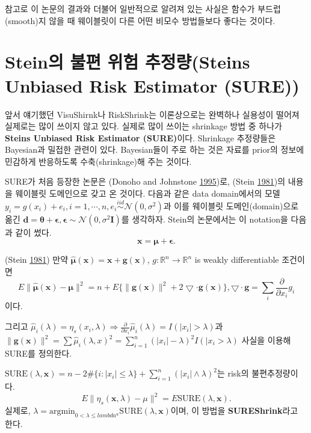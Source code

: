 \documentclass[b5paper,]{book}
\theoremstyle{definition}
\theoremstyle{definition}
\theoremstyle{definition}
\theoremstyle{remark}
\let\BeginKnitrBlock\begin \let\EndKnitrBlock\end
\begin{document}
참고로 이 논문의 결과와 더불어 일반적으로 알려져 있는 사실은 함수가
부드럽(smooth)지 않을 때 웨이블릿이 다른 어떤 비모수 방법들보다 좋다는
것이다.

\section{Stein의 불편 위험 추정량(Steins Unbiased Risk Estimator
(SURE))}\label{stein---steins-unbiased-risk-estimator-sure}

앞서 얘기했던 VisuShirnk나 RiskShrink는 이론상으로는 완벽하나 실용성이
떨어져 실제로는 많이 쓰이지 않고 있다. 실제로 많이 쓰이는 shrinkage 방법
중 하나가 \textbf{Steins Unbiased Risk Estimator (SURE)}이다. Shrinkage
추정량들은 Bayesian과 밀접한 관련이 있다. Bayesian들이 주로 하는 것은
자료를 prior의 정보에 민감하게 반응하도록 수축(shrinkage)해 주는 것이다.

SURE가 처음 등장한 논문은 (Donoho and Johnstone
\protect\hyperlink{ref-Donoho1995}{1995})로, (Stein
\protect\hyperlink{ref-Stein1981}{1981})의 내용을 웨이블릿 도메인으로
갖고 온 것이다. 다음과 같은 data domain에서의 모델
\(y_{i}=g(x_{i})+e_{i}, i=1,\cdots,n,e_{i} \stackrel{iid}{\sim} \mathcal{N}(0,\sigma^{2})\)과
이를 웨이블릿 도메인(domain)으로 옮긴
\(\mathbf{d}=\boldsymbol{\theta}+\boldsymbol{\epsilon}, \boldsymbol{\epsilon} \sim \mathcal{N}(0,\sigma^{2}\mathbf{I})\)를
생각하자. Stein의 논문에서는 이 notation을 다음과 같이 썼다.
\[\mathbf{x}=\boldsymbol{\mu}+\boldsymbol{\epsilon}.\]

\BeginKnitrBlock{theorem}[Stein]
\protect\hypertarget{thm:unnamed-chunk-129}{}{\label{thm:unnamed-chunk-129}
{} }(Stein \protect\hyperlink{ref-Stein1981}{1981})
만약 \(\hat{\boldsymbol{\mu}}\mathbf{(x)}=\mathbf{x}+\mathbf{g(x)}\),
\(g:\mathbb{R}^{n} \rightarrow \mathbb{R}^{n}\) is weakly differentiable
조건이면
\[E \| \hat{\boldsymbol{\mu}}\mathbf{(x)}-\boldsymbol{\mu} \|^{2} =n+ E\{ \|\mathbf{g(x)}\|^{2}+2\bigtriangledown \cdot \mathbf{g(x)} \}, \bigtriangledown\cdot \mathbf{g}=\sum_{i} \frac{\partial}{\partial x_{i}}g_{i}\]
이다.
\EndKnitrBlock{theorem}

그리고
\(\hat{\mu}_{i}(\lambda)=\eta_{s}(x_{i},\lambda) \Rightarrow \frac{\partial}{\partial x_{i}}\hat{\mu}_{i}(\lambda)=I( |x_{i}|>\lambda)\)과
\(\| \mathbf{g(x)} \|^{2}=\sum \hat{\mu}_{i}(\lambda, x)^{2}=\sum_{i=1}^{n}(|x_{i}|-\lambda)^{2}I(|x_{i}>\lambda)\)
사실을 이용해 SURE를 정의한다.

\BeginKnitrBlock{theorem}[SURE]
\protect\hypertarget{thm:unnamed-chunk-130}{}{\label{thm:unnamed-chunk-130}
{}
}\(\text{SURE}(\lambda,\mathbf{x})=n-2\#\{ i: |x_{i}| \leq \lambda \} + \sum_{i=1}^{n}(|x_{i}| \wedge \lambda)^{2}\)는
risk의 불편추정량이다.
\[E \| \eta_{s}(\mathbf{x},\lambda)-\mu \|^{2}=E\text{SURE}(\lambda, \mathbf{x}).\]
실제로,
\(\lambda=\text{argmin}_{0<\lambda \leq lambda^{u}}\text{SURE}(\lambda,\mathbf{x})\)이며,
이 방법을 \textbf{SUREShrink}라고 한다.
\EndKnitrBlock{theorem}
\end{document}
